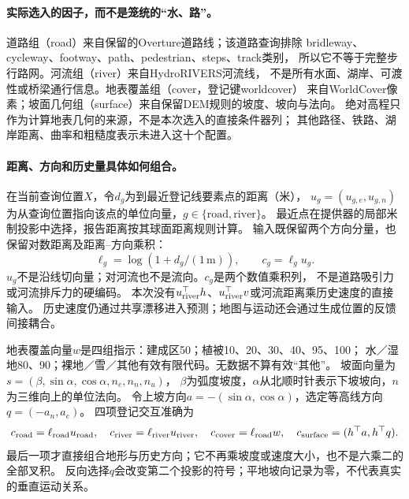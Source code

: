 \paragraph{实际选入的因子，而不是笼统的“水、路”。}
道路组（road）来自保留的Overture道路线；该道路查询排除
bridleway、cycleway、footway、path、pedestrian、steps、track类别，
所以它不等于完整步行路网。河流组（river）来自HydroRIVERS河流线，
不是所有水面、湖岸、可渡性或桥梁通行信息。地表覆盖组（cover，登记键worldcover）
来自WorldCover像素；坡面几何组（surface）来自保留DEM规则的坡度、坡向与法向。
绝对高程只作为计算地表几何的来源，不是本次选入的直接条件器列；
其他路径、铁路、湖岸距离、曲率和粗糙度表示未进入这十个配置。

\paragraph{距离、方向和历史量具体如何组合。}
在当前查询位置$X$，令$d_g$为到最近登记线要素点的距离（米），
$u_g=(u_{g,e},u_{g,n})$为从查询位置指向该点的单位向量，$g\in\{\mathrm{road},\mathrm{river}\}$。
最近点在提供器的局部米制投影中选择，报告距离按其球面距离规则计算。
输入既保留两个方向分量，也保留对数距离及距离--方向乘积：
\begin{equation}\label{eq:main-map-distance}
 \ell_g=\log(1+d_g/(1\,\mathrm m)),\qquad c_g=\ell_g u_g .
\end{equation}
$u_g$不是沿线切向量；对河流也不是流向。$c_g$是两个数值乘积列，
不是道路吸引力或河流排斥力的硬编码。
本次没有$u_{\rm river}^{\top}h$、$u_{\rm river}^{\top}v$或河流距离乘历史速度的直接输入。
历史速度仍通过共享漂移进入预测；地图与运动还会通过生成位置的反馈间接耦合。

地表覆盖向量$w$是四组指示：建成区50；植被10、20、30、40、95、100；
水／湿地80、90；裸地／雪／其他有效有限代码。无数据不算有效“其他”。
坡面向量为$s=(\beta,\sin\alpha,\cos\alpha,n_e,n_n,n_u)$，
$\beta$为弧度坡度，$\alpha$从北顺时针表示下坡坡向，$n$为三维向上的单位法向。
令上坡方向$a=-(\sin\alpha,\cos\alpha)$，选定等高线方向$q=(-a_n,a_e)$。
四项登记交互准确为
\begin{equation}\label{eq:main-map-compositions}
 c_{\rm road}=\ell_{\rm road}u_{\rm road},\quad
 c_{\rm river}=\ell_{\rm river}u_{\rm river},\quad
 c_{\rm cover}=\ell_{\rm road}w,\quad
 c_{\rm surface}=(h^\top a,h^\top q).
\end{equation}
最后一项才直接组合地形与历史方向；它不再乘坡度或速度大小，也不是六乘二的全部叉积。
反向选择$q$会改变第二个投影的符号；平地坡向记录为零，不代表真实的垂直运动关系。


